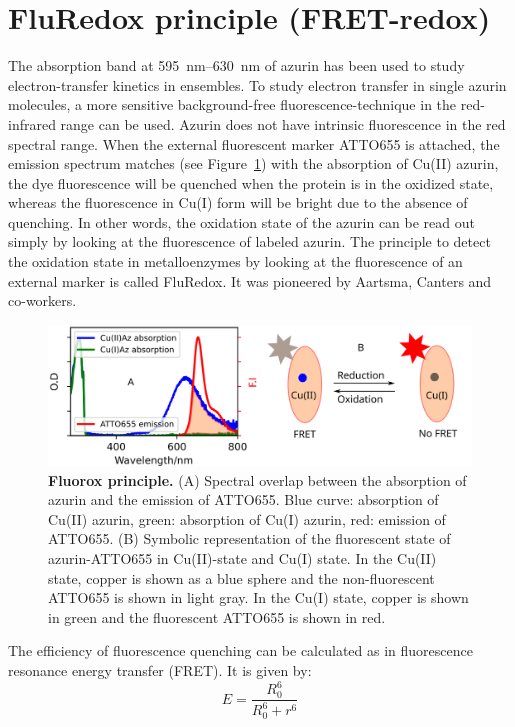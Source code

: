 \section{FluRedox principle (FRET-redox)}
The absorption band at \SIrange{595}{630}{\nm} of azurin has been used to study electron-transfer kinetics in ensembles.
To study electron transfer in single azurin molecules, a more sensitive background-free fluorescence-technique in the red-infrared range can be used.
Azurin does not have intrinsic fluorescence in the red spectral range.
When the external fluorescent marker ATTO655 is attached, the emission spectrum matches (see Figure~\ref{fig:flurox_azurin}) with the absorption of Cu(II) azurin, the dye fluorescence will be quenched when the protein is in the oxidized state, whereas the fluorescence in Cu(I) form will be bright due to the absence of quenching.
In other words, the oxidation state of the azurin can be read out simply by looking at the fluorescence of labeled azurin.
The principle to detect the oxidation state in metalloenzymes by looking at the fluorescence of an external marker is called FluRedox. It was pioneered by Aartsma, Canters and co-workers.\cite{kuznetsova2008the,goldsmith2011redox,tabares2011fluorescence}
\begin{figure}
	\centering
	\includegraphics[width=\textwidth]{flurox_azurin}
	\caption{\textbf{Fluorox principle.} (A) Spectral overlap between the absorption of azurin and the emission of ATTO655. Blue curve: absorption of Cu(II) azurin, green: absorption of Cu(I) azurin, red: emission of ATTO655.
	(B) Symbolic representation of the fluorescent state of azurin-ATTO655 in Cu(II)-state and Cu(I) state. In the Cu(II) state, copper is shown as a blue sphere and the non-fluorescent ATTO655 is shown in light gray. In the Cu(I) state, copper is shown in green and the fluorescent ATTO655 is shown in red.}
	\label{fig:flurox_azurin}
\end{figure}
The efficiency of fluorescence quenching can be calculated as in fluorescence resonance energy transfer (FRET). It is given by:
\begin{equation}
	E = \frac{R_0^6}{R_0^6 + r^6}	
\end{equation}
